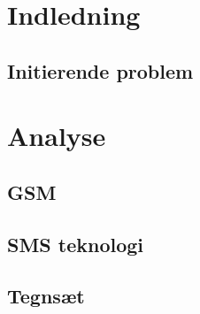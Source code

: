 \documentclass[12pt,a4paper]{report}
\begin{document}
\setcounter{page}{2}

\begin{titlepage}

\thispagestyle{empty}
\end{titlepage}

\newpage
\thispagestyle{empty}
\mbox{}



\tableofcontents
\thispagestyle{empty}

\renewcommand{\chaptername}{Kapitel}

\chapter{Indledning}
\setcounter{page}{3}
	
	\section{Initierende problem}
	

\chapter{Analyse}
 
    

    \section{GSM}
    

	\section{SMS teknologi}
	
	
	\section{Tegnsæt}
	
	
\end{document}

